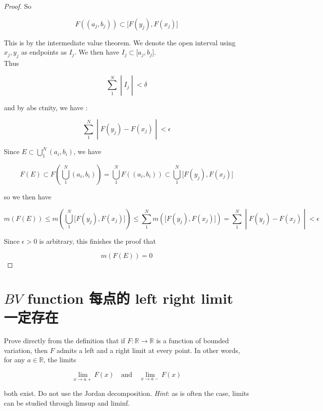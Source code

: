 \documentclass{qlnotes-export}
\begin{document}
\begin{proof}
So

\[F((a_{j},b_{j})) \subset \lbrack F(y_{j}),F(x_{j})\rbrack\]

This is by the intermediate value theorem. We denote the open interval using \(x_{j},y_{j}\) as endpoints as \(I_{j}\). We then have \(I_{j} \subset \lbrack a_{j},b_{j}\rbrack\).\\
Thus

\[\left. \sum\limits_{1}^{N} \middle| I_{j} \middle| < \delta \right.\]

and by abs ctnity, we have :

\[\left. \sum\limits_{1}^{N} \middle| F(y_{j}) - F(x_{j}) \middle| < \epsilon \right.\]

Since \(E \subset \bigcup_{1}^{N}(a_{i},b_{i})\), we have

\[F(E) \subset F(\bigcup\limits_{1}^{N}(a_{i},b_{i})) = \bigcup\limits_{1}^{N}F((a_{i},b_{i})) \subset \bigcup\limits_{1}^{N}\lbrack F(y_{j}),F(x_{j})\rbrack\]

so we then have

\[\left. m(F(E)) \leq m(\bigcup\limits_{1}^{N}\lbrack F(y_{j}),F(x_{j})\rbrack) \leq \sum\limits_{1}^{N}m(\lbrack F(y_{j}),F(x_{j})\rbrack) = \sum\limits_{1}^{N} \middle| F(y_{j}) - F(x_{j}) \middle| < \epsilon \right.\]

Since \(\epsilon > 0\) is arbitrary, this finishes the proof that

\[m(F(E)) = 0\]

\end{proof}

\section{\texorpdfstring{\(BV\) function 每点的 left{ } right limit 一定存在}{BV function 每点的 left  right limit 一定存在}}\label{bv-function-ux6bcfux70b9ux7684-left-right-limit-ux4e00ux5b9aux5b58ux5728}

Prove directly from the definition that if \(F:{\mathbb{R}}\rightarrow{\mathbb{R}}\) is a function of bounded variation, then \(F\) admits a left and a right limit at every point. In other words, for any \(a \in {\mathbb{R}}\), the limits

\[\lim\limits_{x\rightarrow a +}F(x)\quad\text{and}\quad\lim\limits_{x\rightarrow a -}F(x)\]

both exist. Do not use the Jordan decomposition. \emph{Hint}: as is often the case, limits can be studied through limsup and liminf.
\end{document}
